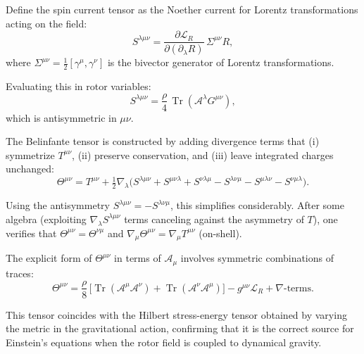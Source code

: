 \documentclass[11pt,a4paper]{article}
\numberwithin{equation}{section}
\theoremstyle{plain}
\theoremstyle{definition}
\theoremstyle{remark}
\DeclareMathOperator{\Tr}{Tr}
\begin{document}
Define the spin current tensor as the Noether current for Lorentz transformations acting on the field:
\begin{equation}
S^{\lambda\mu\nu} = \frac{\partial \mathcal{L}_R}{\partial(\partial_\lambda R)}\,\Sigma^{\mu\nu}R,
\end{equation}
where $\Sigma^{\mu\nu} = \frac{1}{2}[\gamma^\mu, \gamma^\nu]$ is the bivector generator of Lorentz transformations.

Evaluating this in rotor variables:
\begin{equation}
S^{\lambda\mu\nu} = \frac{\rho}{4}\,\Tr(\mathcal{A}^\lambda G^{\mu\nu}),
\end{equation}
which is antisymmetric in $\mu\nu$.

The Belinfante tensor is constructed by adding divergence terms that (i) symmetrize $T^{\mu\nu}$, (ii) preserve conservation, and (iii) leave integrated charges unchanged:
\begin{equation}
\Theta^{\mu\nu} = T^{\mu\nu} + \tfrac{1}{2}\nabla_\lambda\!\big( S^{\lambda\mu\nu} + S^{\mu\nu\lambda} + S^{\nu\lambda\mu} - S^{\lambda\nu\mu} - S^{\mu\lambda\nu} - S^{\nu\mu\lambda} \big).
\end{equation}

Using the antisymmetry $S^{\lambda\mu\nu} = -S^{\lambda\nu\mu}$, this simplifies considerably. After some algebra (exploiting $\nabla_\lambda S^{\lambda\mu\nu}$ terms canceling against the asymmetry of $T$), one verifies that $\Theta^{\mu\nu} = \Theta^{\nu\mu}$ and $\nabla_\mu \Theta^{\mu\nu} = \nabla_\mu T^{\mu\nu}$ (on-shell).

The explicit form of $\Theta^{\mu\nu}$ in terms of $\mathcal{A}_\mu$ involves symmetric combinations of traces:
\begin{equation}
\Theta^{\mu\nu} = \frac{\rho}{8}\,\big[\Tr(\mathcal{A}^\mu\mathcal{A}^\nu) + \Tr(\mathcal{A}^\nu\mathcal{A}^\mu)\big] - g^{\mu\nu}\mathcal{L}_R + \nabla\text{-terms}.
\end{equation}

This tensor coincides with the Hilbert stress-energy tensor obtained by varying the metric in the gravitational action, confirming that it is the correct source for Einstein's equations when the rotor field is coupled to dynamical gravity.
\end{document}

